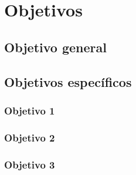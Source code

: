 \chapter{Objetivos}
\label{chap:objetivos}


\section{Objetivo general}


\section{Objetivos específicos}

\subsection{Objetivo 1}

\subsection{Objetivo 2}

\subsection{Objetivo 3}
